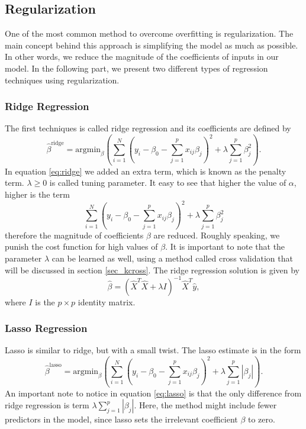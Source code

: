 \documentclass [11pt]{article}
\begin{document}
\subsection{Regularization}
One of the most common method to overcome overfitting is regularization. The main concept behind this approach is simplifying the model as much as possible. In other words, we reduce the magnitude of the coefficients of inputs in our model. In the following part, we present two different types of regression techniques using regularization.

\subsubsection*{Ridge Regression}
The first techniques is called ridge regression and its coefficients are defined by 
\begin{equation}
\hat{\beta}^{\text{ridge}}=\text{argmin}_{\beta} ( \sum_{i=1}^{N}(y_{i}- \beta_{0}- \sum_{j=1}^{p}x_{ij}\beta_{j})^{2}+ \lambda \sum_{j=1}^{p} \beta_{j}^{2}).
\label{eq:ridge}
\end{equation}
In equation \eqref{eq:ridge} we added an extra term, which is known as the penalty term. $\lambda \geq 0$ is called tuning parameter. It easy to see that higher the value of $\alpha$, higher is the term 
\begin{equation*}
\sum_{i=1}^{N}(y_{i}- \beta_{0}- \sum_{j=1}^{p}x_{ij}\beta_{j})^{2}+ \lambda \sum_{j=1}^{p} \beta_{j}^{2}
\end{equation*}
therefore the magnitude of coefficients $\beta$ are reduced. Roughly speaking, we punish the cost function for high values of $\beta$. It is important to note that the parameter $\lambda$ can be learned as well, using a method called cross validation that will be discussed in section \ref{sec_kcross}.
The ridge regression solution is given by
\begin{equation}
\hat{\beta} =\left(\hat{X}^T\hat{X} + \lambda I \right)^{-1}\hat{X}^T\hat{y},
\end{equation}
where $I$ is the $p \times p$ identity matrix.
\subsubsection*{Lasso Regression}
Lasso is similar to ridge, but with a small twist. The lasso estimate is in the form
\begin{equation}
\hat{\beta}^{\text{lasso}}=\text{argmin}_{\beta} ( \sum_{i=1}^{N}(y_{i}- \beta_{0}- \sum_{j=1}^{p}x_{ij}\beta_{j})^{2}+ \lambda \sum_{j=1}^{p} |\beta_{j}|).
\label{eq:lasso}
\end{equation}
An important note to notice in equation \eqref{eq:lasso} is that the only difference from ridge regression is term $\lambda \sum_{j=1}^{p} |\beta_{j}|$. Here, the method might include fewer predictors in the model, since lasso sets the irrelevant coefficient $\beta$ to zero.
\end{document}
